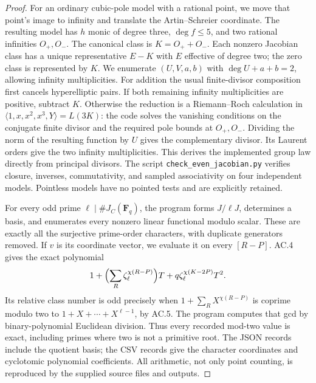 \begin{proof}
For an ordinary cubic-pole model with a rational point, we move that
point's image to infinity and translate the Artin--Schreier
coordinate.  The resulting model has $h$ monic of degree three,
$\deg f\le5$, and two rational infinities $O_+,O_-$.
The canonical class is $K=O_++O_-$.  Each nonzero Jacobian class
has a unique representative $E-K$ with $E$ effective of degree two;
the zero class is represented by $K$.  We enumerate
$(U,V,a,b)$ with $\deg U+a+b=2$, allowing infinity multiplicities.
For addition the usual finite-divisor composition first cancels
hyperelliptic pairs.  If both remaining infinity multiplicities
are positive, subtract $K$.  Otherwise the reduction is a
Riemann--Roch calculation in
$\langle1,x,x^2,x^3,Y\rangle=L(3K)$: the code solves the vanishing
conditions on the conjugate finite divisor and the required pole
bounds at $O_+,O_-$.  Dividing the norm of the resulting function
by $U$ gives the complementary divisor.  Its Laurent orders give
the two infinity multiplicities.  This derives the implemented
group law directly from principal divisors.  The script
\texttt{check\_even\_jacobian.py} verifies closure, inverses,
commutativity, and sampled associativity on four independent models.
Pointless models have no pointed tests and are explicitly retained.

For every odd prime $\ell\mid\#J_C(\mathbf F_q)$, the program
forms $J/\ell J$, determines a basis, and enumerates every nonzero
linear functional modulo scalar.  These are exactly all the
surjective prime-order characters, with duplicate generators
removed.  If $v$ is its coordinate vector, we evaluate it on
every $[R-P]$.  AC.4 gives the exact polynomial
\[
 1+\Bigl(\sum_R\zeta_\ell^{\chi(R-P)}\Bigr)T
       +q\zeta_\ell^{\chi(K-2P)}T^2.
\]
Its relative class number is odd precisely when
$1+\sum_R X^{\chi(R-P)}$ is coprime modulo two to
$1+X+\cdots+X^{\ell-1}$, by AC.5.  The program computes that gcd
by binary-polynomial Euclidean division.  Thus every recorded
mod-two value is exact, including primes where two is not a
primitive root.  The JSON records include the quotient basis;
the CSV records give the character coordinates and cyclotomic
polynomial coefficients.  All arithmetic, not only point counting,
is reproduced by the supplied source files and outputs.
\end{proof}

